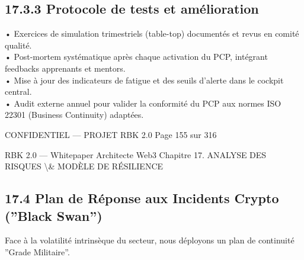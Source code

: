 \documentclass[12pt,landscape,a4paper]{article}
\newenvironment{confidential}
{\begin{tcolorbox}[
    colback=rbkred!5!white,
    colframe=rbkred!75!black,
    title=CONFIDENTIEL,
    fonttitle=\bfseries\color{white},
    coltitle=rbkred!75!black,
    breakable,
    enhanced,
    frame hidden,
    borderline west={2pt}{0pt}{rbkred!75!black}
]}
{\end{tcolorbox}}
\begin{document}
\subsection{17.3.3 Protocole de tests et amélioration}
• Exercices de simulation trimestriels (table-top) documentés et revus en comité qualité.\\
\vspace{0.5em}
• Post-mortem systématique après chaque activation du PCP, intégrant feedbacks apprenants et mentors.\\
\vspace{0.5em}
• Mise à jour des indicateurs de fatigue et des seuils d’alerte dans le cockpit central.\\
\vspace{0.5em}
• Audit externe annuel pour valider la conformité du PCP aux normes ISO 22301 (Business Continuity) adaptées.\\
\vspace{0.5em}
\vspace{0.5em}
\begin{confidential}CONFIDENTIEL — PROJET RBK 2.0                                  Page 155 sur 316\end{confidential}
RBK 2.0 — Whitepaper Architecte Web3                                         Chapitre 17. ANALYSE DES RISQUES \textbackslash{}& MODÈLE DE RÉSILIENCE\\
\vspace{0.5em}
\vspace{0.5em}
\vspace{0.5em}
\subsection{17.4 Plan de Réponse aux Incidents Crypto (”Black Swan”)}
Face à la volatilité intrinsèque du secteur, nous déployons un plan de continuité ”Grade Militaire”.\\
\vspace{0.5em}
\vspace{0.5em}
\end{document}
